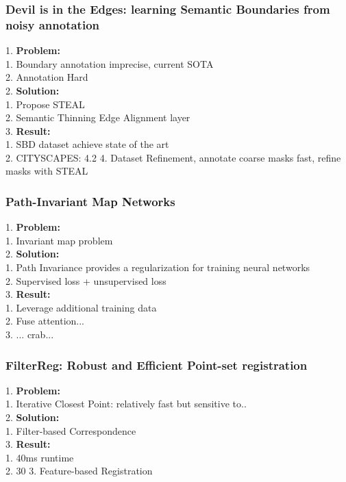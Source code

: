 \subsubsection{Devil is in the Edges: learning Semantic Boundaries from noisy annotation}
    1. {\bf Problem:} \\
        1. Boundary annotation imprecise, current SOTA \\
        2. Annotation Hard \\
    2. {\bf Solution:} \\
        1. Propose STEAL \\
        2. Semantic Thinning Edge Alignment layer \\
    3. {\bf Result:} \\
        1. SBD dataset achieve state of the art \\
        2. CITYSCAPES: 4.2%
    4. Dataset Refinement, annotate coarse masks fast, refine masks with STEAL \\
\subsubsection{Path-Invariant Map Networks}
    1. {\bf Problem:} \\
        1. Invariant map problem \\
    2. {\bf Solution:} \\
        1. Path Invariance provides a regularization for training neural networks \\
        2. Supervised loss + unsupervised loss \\
    3. {\bf Result:} \\
        1. Leverage additional training data \\
        2. Fuse attention... \\
        3. ... crab... \\
\subsubsection{FilterReg: Robust and Efficient Point-set registration}
    1. {\bf Problem:} \\
        1. Iterative Closest Point: relatively fast but sensitive to.. \\
    2. {\bf Solution:} \\
        1. Filter-based Correspondence \\
    3. {\bf Result:}  \\
        1. 40ms runtime \\
        2. 30%
        3. Feature-based Registration \\
